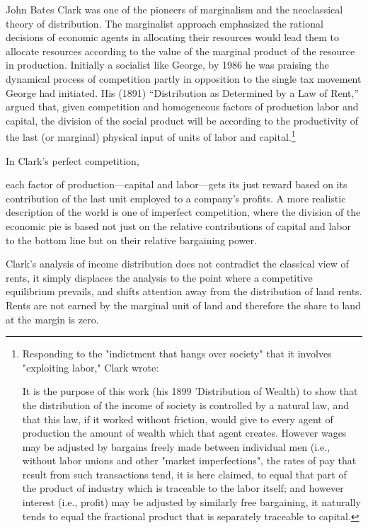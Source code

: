  John Bates Clark was one of the pioneers of marginalism and the neoclassical theory of  distribution.  The marginalist approach emphasized the rational decisions of economic agents in allocating their resources would lead them to allocate resources according to the value of the marginal product %
 of the resource in production.  
 Initially a socialist like George, %
 by 1986 he was praising the dynamical process of competition partly in opposition to the single tax movement George had initiated.  His (1891) ``Distribution as Determined by a Law of Rent,'' argued that, given  competition and homogeneous factors of production labor and capital, the division of the social product will be according to the productivity of the last (or marginal) physical input of units of labor and capital.\footnote{Responding to the "indictment that hangs over society" that it involves "exploiting labor," Clark wrote:

    It is the purpose of this work (his 1899 'Distribution of Wealth) to show that the distribution of the income of society is controlled by a natural law, and that this law, if it worked without friction, would give to every agent of production the amount of wealth which that agent creates. However wages may be adjusted by bargains freely made between individual men (i.e., without labor unions and other "market imperfections", the rates of pay that result from such transactions tend, it is here claimed, to equal that part of the product of industry which is traceable to the labor itself; and however interest (i.e., profit) may be adjusted by similarly free bargaining, it naturally tends to equal the fractional product that is separately traceable to capital.} 

 In Clark's  perfect competition,%
 
 each factor of production—capital and labor—gets its just reward based on its contribution of  the last unit employed to a company’s profits. A more realistic description of the world is one of imperfect competition, where the division of the economic pie is based not just on the relative contributions of capital and labor to the bottom line but on their relative bargaining power. 
 
Clark's analysis of income distribution does not contradict the classical view of rents, it simply displaces the analysis to the point where a competitive equilibrium prevails, and shifts attention away from the distribution of land rents. Rents are not earned by the marginal unit of land and therefore the share to land at the margin is zero. 



